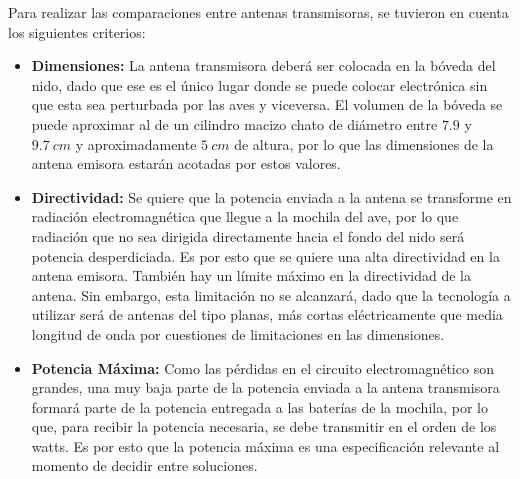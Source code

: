 Para realizar las comparaciones entre antenas transmisoras, se tuvieron en cuenta los siguientes criterios:
\begin{itemize}
\item \textbf{Dimensiones:} La antena transmisora deberá ser colocada en la bóveda del nido, dado que ese es el único lugar donde se puede colocar electrónica sin que esta sea perturbada por las aves y viceversa. El volumen de la bóveda se puede aproximar al de un cilindro macizo chato de diámetro entre $7.9$ y $9.7 \ cm$ y aproximadamente $5 \ cm$ de altura, por lo que las dimensiones de la antena emisora estarán acotadas por estos valores.

\item \textbf{Directividad:} Se quiere que la potencia enviada a la antena se transforme en radiación electromagnética que llegue a la mochila del ave, por lo que radiación que no sea dirigida directamente hacia el fondo del nido será potencia desperdiciada. Es por esto que se quiere una alta directividad en la antena emisora. También hay un límite máximo en la directividad de la antena. Sin embargo, esta limitación no se alcanzará, dado que la tecnología a utilizar será de antenas del tipo planas, más cortas eléctricamente que media longitud de onda por cuestiones de limitaciones en las dimensiones. 

\item \textbf{Potencia Máxima:} Como las pérdidas en el circuito electromagnético son grandes, una muy baja parte de la potencia enviada a la antena transmisora formará parte de la potencia entregada a las baterías de la mochila, por lo que, para recibir la potencia necesaria, se debe transmitir en el orden de los watts. Es por esto que la potencia máxima es una especificación relevante al momento de decidir entre soluciones.
\end{itemize}

